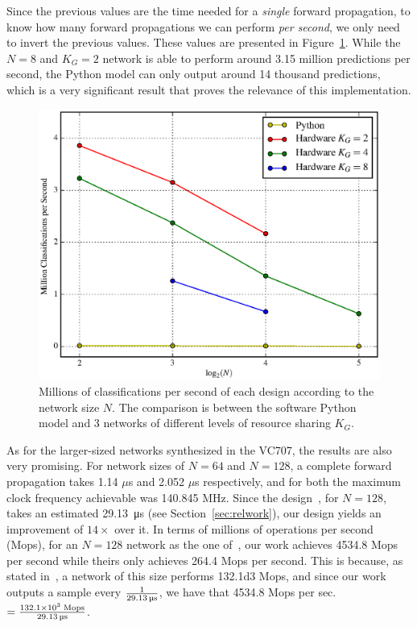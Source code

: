 \documentclass{IEEEtran}
\begin{document}
Since the previous values are the time needed for a \emph{single} forward propagation, to know how many forward propagations we can perform \emph{per second},
we only need to invert the previous values. These values are presented in Figure~\ref{fig:Mclass-psec}. While the $N=8$ and $K_G=2$ network is able to
perform around 3.15 million predictions per second, the Python model can only output around 14 thousand predictions, which is a very significant result that
proves the relevance of this implementation.

\begin{figure}
    \centering
    \includegraphics[width=\linewidth]{figures/Mclass-psec.eps}
    \caption[Millions of classifications per second of each design according to the network size $N$]{Millions of classifications per second of each design according to the network size $N$. The comparison is between the software Python model and 3 networks of different levels of resource sharing $K_G$.}
    \label{fig:Mclass-psec}
\end{figure}

As for the larger-sized networks synthesized in the VC707, the results are also very promising. For network sizes of $N=64$ and $N=128$, a complete
forward propagation takes 1.14 $\mu$s and 2.052 $\mu$s respectively, and for both the maximum clock frequency achievable was 140.845 MHz. Since the
design~\cite{Chang15}, for $N=128$, takes an estimated \SI{29.13}{\micro\second} (see Section~\ref{sec:relwork}), our design yields an improvement of $14\times$
over it.
In terms of millions of operations per second (Mops), for an $N=128$ network as the one of~\cite{Chang15}, our work achieves \num{4534.8} Mops per second
while theirs only achieves \num{264.4} Mops per second. This is because, as stated in~\cite{Chang15}, a network of this size performs \num{132.1d3} Mops, and since
our work outputs a sample every $1 \over \SI{29.13}{\micro\second}$, we have that 4534.8 Mops per sec. $=\frac{\num{132.1d3} \; \text{Mops}}{\SI{29.13}{\micro\second}}$.
\end{document}
